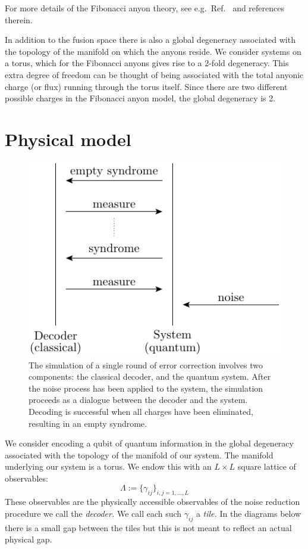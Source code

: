 For more details of the Fibonacci anyon
theory, see e.g.\ Ref.~\cite{Nayak2008} and references therein.

In addition to the fusion space there is also a
global degeneracy associated with the topology of the
manifold on which the anyons reside.
We consider systems on a torus,
which for the Fibonacci anyons gives rise to a 2-fold degeneracy.
This extra degree of freedom can be thought of being
associated with the total anyonic charge (or flux) running through
the torus itself. Since there are two different possible charges
in the Fibonacci anyon model, the global degeneracy is 2.


%
%

\section{Physical model}

\begin{figure}
\begin{center}
\includegraphics[]{pic-process.pdf}
\end{center}
\caption{
The simulation of a single round of
error correction involves two components: 
the classical decoder, and the quantum system.
After the noise process has been applied to the
system, the simulation proceeds as a dialogue between
the decoder and the system. 
Decoding is successful when all charges have been eliminated,
resulting in an empty syndrome.
}
\label{PicProcess}
\end{figure}



We consider encoding a qubit of quantum information in the global degeneracy associated
with the topology of the manifold of our system.
The manifold underlying our system is a torus.
We endow this with an $L\times L$ square lattice of observables:
$$
    \Lambda := \bigl\{ \gamma_{ij} \bigr\}_{i,j=1,...,L}
$$
These observables are the physically accessible observables of
the noise reduction procedure we call the \emph{decoder.}
We call each such $\gamma_{ij}$ a \emph{tile.}
In the diagrams below 
there is a small gap between the tiles but this is not meant
to reflect an actual physical gap.

